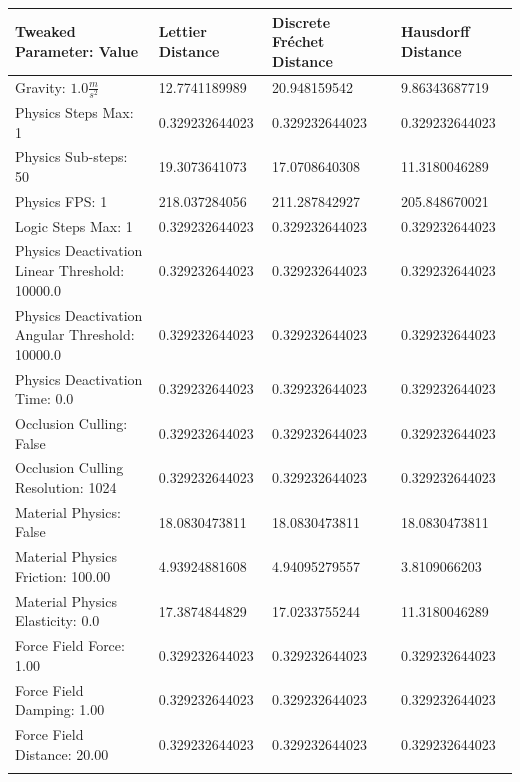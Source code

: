 \begin{table}[htbp]
\centering
\footnotesize
\def\arraystretch{1.1}
\begin{tabular}{ | l || l | l | l | }
\hline
\rowcolor{gray}
Tweaked Parameter: Value & Lettier Distance & Discrete Fr{\'e}chet Distance & Hausdorff Distance \\ \hline
Gravity: $1.0\frac{m}{s^2}$ & 12.7741189989 & 20.948159542 & 9.86343687719 \\ \hline
\rowcolor{cyan}
Physics Steps Max: 1 & 0.329232644023 & 0.329232644023 & 0.329232644023 \\ \hline
Physics Sub-steps: 50 & 19.3073641073 & 17.0708640308 & 11.3180046289 \\ \hline
Physics FPS: 1 & 218.037284056 & 211.287842927 & 205.848670021 \\ \hline
\rowcolor{cyan}
Logic Steps Max: 1 & 0.329232644023 & 0.329232644023 & 0.329232644023 \\ \hline
\rowcolor{cyan}
Physics Deactivation Linear Threshold: 10000.0 & 0.329232644023 & 0.329232644023 & 0.329232644023 \\ \hline
\rowcolor{cyan}
Physics Deactivation Angular Threshold: 10000.0 & 0.329232644023 & 0.329232644023 & 0.329232644023 \\ \hline
\rowcolor{cyan}
Physics Deactivation Time: 0.0 & 0.329232644023 & 0.329232644023 & 0.329232644023 \\ \hline
\rowcolor{cyan}
Occlusion Culling: False & 0.329232644023 & 0.329232644023 & 0.329232644023 \\ \hline
\rowcolor{cyan}
Occlusion Culling Resolution: 1024 & 0.329232644023  & 0.329232644023  & 0.329232644023 \\ \hline
Material Physics: False & 18.0830473811 & 18.0830473811  & 18.0830473811 \\ \hline
Material Physics Friction: 100.00 & 4.93924881608  & 4.94095279557  & 3.8109066203 \\ \hline
Material Physics Elasticity: 0.0 & 17.3874844829  & 17.0233755244  & 11.3180046289 \\ \hline
\rowcolor{cyan}
Force Field Force: 1.00 & 0.329232644023  & 0.329232644023  & 0.329232644023 \\ \hline
\rowcolor{cyan}
Force Field Damping: 1.00 & 0.329232644023  & 0.329232644023  & 0.329232644023 \\ \hline
\rowcolor{cyan}
Force Field Distance: 20.00 & 0.329232644023  & 0.329232644023  & 0.329232644023 \\ \hline
\rowcolor{cyan}

\end{tabular}
\end{table}
